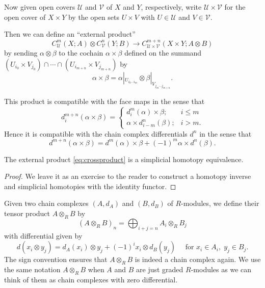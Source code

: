 \documentclass[a4paper,openany]{scrbook}
\begin{document}

Now given open covers $\mathcal U$ and $\mathcal V$ of $X$ and $Y$, respectively, write $\mathcal U \times \mathcal V$ for the open cover of $X \times Y$ by the open sets $U \times V$ with $U \in \mathcal U$ and $V \in \mathcal V$.

Then we can define an ``external product''
\begin{equation}\label{eq:crossproduct}
C^m_{\mathcal U}(X;A) \otimes C^n_{\mathcal V}(Y;B) \to C^{m+n}_{\mathcal U \times \mathcal V}(X\times Y;A \otimes B)
\end{equation}
by sending $\alpha \otimes \beta$ to the cochain $\alpha \times \beta$ defined on the summand $(U_{i_0} \times V_{j_0}) \cap \cdots \cap (U_{i_{m+n}} \times V_{j_{m+n}})$ by
\[
\alpha \times \beta = \alpha|_{U_{i_0\cdots i_m}} \otimes \beta|_{V_{j_m\cdots j_{m+n}}}.
\]

This product is compatible with the face maps in the sense that
\[
d^{m+n}_i(\alpha \times \beta) = \begin{cases}
d^m_i(\alpha) \times \beta; & i \leq m\\
\alpha \times d^n_{i-m}(\beta); & i > m.
\end{cases}
\]
Hence it is compatible with the chain complex differentials $d^n$ in the sense that
\[
d^{m+n}(\alpha \times \beta) = d^m(\alpha) \times \beta + (-1)^m \alpha \times d^n(\beta).
\]

\begin{thm}\label{thm:Eilenberg-Zilber}
The external product \eqref{eq:crossproduct} is a simplicial homotopy equivalence.
\end{thm}
\begin{proof}
We leave it as an exercise to the reader to construct a homotopy inverse and simplicial homotopies with the identity functor.
\end{proof}

Given two chain complexes $(A,d_A)$ and $(B,d_B)$ of $R$-modules, we define their tensor product $A \otimes_R B$ by
\[
(A \otimes_R B)_n = \bigoplus_{i+j=n} A_i \otimes_R B_j
\]
with differential given by
\[
d(x_i \otimes y_j) = d_A(x_i) \otimes y_j + (-1)^i x_i \otimes d_B(y_j) \quad \text{ for } x_i \in A_i,\; y_j \in B_j.
\]
The sign convention ensures that $A \otimes_R B$ is indeed a chain complex again. We use the same notation $A \otimes_R B$ when $A$ and $B$ are just graded $R$-modules as we can think of them as chain complexes with zero differential.
\end{document}
